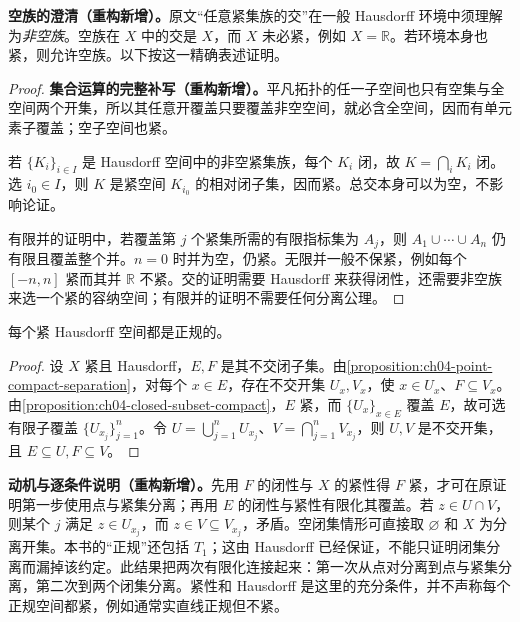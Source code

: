 \documentclass[../../main.tex]{subfiles}%
\begin{document}
\begin{remark}
\textbf{空族的澄清（重构新增）。}原文“任意紧集族的交”在一般 Hausdorff 环境中须理解为\emph{非空族}。空族在 $X$ 中的交是 $X$，而 $X$ 未必紧，例如 $X=\mathbb R$。若环境本身也紧，则允许空族。以下按这一精确表述证明。
\end{remark}
\begin{proof}
\textbf{集合运算的完整补写（重构新增）。}平凡拓扑的任一子空间也只有空集与全空间两个开集，所以其任意开覆盖只要覆盖非空空间，就必含全空间，因而有单元素子覆盖；空子空间也紧。

若 $\{K_i\}_{i\in I}$ 是 Hausdorff 空间中的非空紧集族，每个 $K_i$ 闭，故 $K=\bigcap_iK_i$ 闭。选 $i_0\in I$，则 $K$ 是紧空间 $K_{i_0}$ 的相对闭子集，因而紧。总交本身可以为空，不影响论证。

有限并的证明中，若覆盖第 $j$ 个紧集所需的有限指标集为 $A_j$，则 $A_1\cup\cdots\cup A_n$ 仍有限且覆盖整个并。$n=0$ 时并为空，仍紧。无限并一般不保紧，例如每个 $[-n,n]$ 紧而其并 $\mathbb R$ 不紧。交的证明需要 Hausdorff 来获得闭性，还需要非空族来选一个紧的容纳空间；有限并的证明不需要任何分离公理。
\end{proof}
\begin{proposition}\label{proposition:ch04-compact-hausdorff-normal}
每个紧 Hausdorff 空间都是正规的。
\end{proposition}
\begin{proof}
设 $X$ 紧且 Hausdorff，$E,F$ 是其不交闭子集。由\cref{proposition:ch04-point-compact-separation}，对每个 $x\in E$，存在不交开集 $U_x,V_x$，使 $x\in U_x$、$F\subseteq V_x$。由\cref{proposition:ch04-closed-subset-compact}，$E$ 紧，而 $\{U_x\}_{x\in E}$ 覆盖 $E$，故可选有限子覆盖 $\{U_{x_j}\}_{j=1}^n$。令 $U=\bigcup_{j=1}^nU_{x_j}$、$V=\bigcap_{j=1}^nV_{x_j}$，则 $U,V$ 是不交开集，且 $E\subseteq U,F\subseteq V$。
\end{proof}
\begin{remark}
\textbf{动机与逐条件说明（重构新增）。}先用 $F$ 的闭性与 $X$ 的紧性得 $F$ 紧，才可在原证明第一步使用点与紧集分离；再用 $E$ 的闭性与紧性有限化其覆盖。若 $z\in U\cap V$，则某个 $j$ 满足 $z\in U_{x_j}$，而 $z\in V\subseteq V_{x_j}$，矛盾。空闭集情形可直接取 $\varnothing$ 和 $X$ 为分离开集。本书的“正规”还包括 $T_1$；这由 Hausdorff 已经保证，不能只证明闭集分离而漏掉该约定。此结果把两次有限化连接起来：第一次从点对分离到点与紧集分离，第二次到两个闭集分离。紧性和 Hausdorff 是这里的充分条件，并不声称每个正规空间都紧，例如通常实直线正规但不紧。
\end{remark}
\end{document}
